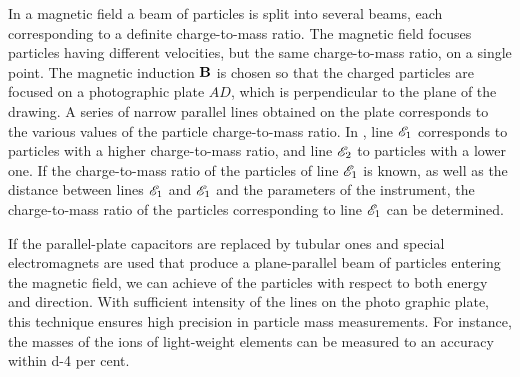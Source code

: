 In a magnetic field a beam of particles is split into several beams, each corresponding to a definite charge-to-mass ratio. The magnetic field focuses particles having different velocities, but the same charge-to-mass ratio, on a single point. The magnetic induction $\vb{B}$ is chosen so that the charged particles are focused on a photographic plate $AD$, which is perpendicular to the plane of the drawing. A series of narrow parallel lines obtained on the plate corresponds to the various values of the particle charge-to-mass ratio. In , line $\mathscr{E}_{1}$ corresponds to particles with a higher charge-to-mass ratio, and line $\mathscr{E}_{2}$ to particles with a lower one. If the charge-to-mass ratio of the particles of line $\mathscr{E}_{1}$ is known, as well as the distance between lines $\mathscr{E}_{1}$ and $\mathscr{E}_{1}$ and the parameters of the instrument, the charge-to-mass ratio of the particles corresponding to line $\mathscr{E}_{1}$ can be determined.

If the parallel-plate capacitors are replaced by tubular ones and special electromagnets are used that produce a plane-parallel beam of particles entering the magnetic field, we can achieve  of the particles with respect to both energy and direction. With sufficient intensity of the lines on the photo­ graphic plate, this technique ensures high precision in particle mass measurements. For instance, the masses of the ions of light-weight elements can be measured to an accuracy within \num{d-4} per cent.

